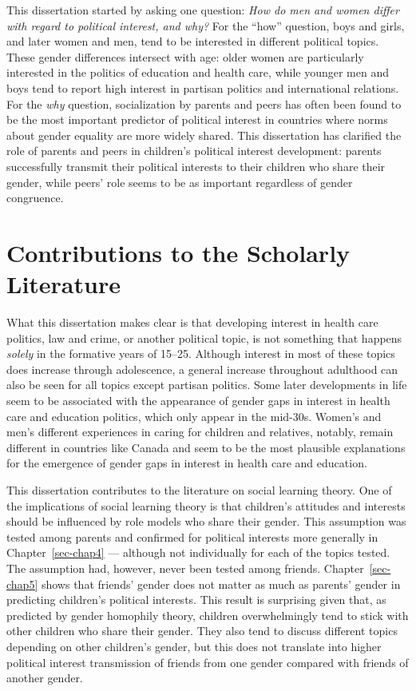 \documentclass[
  letterpaper,
  DIV=11,
  numbers=noendperiod]{scrreprt}
\begin{document}
This dissertation started by asking one question: \emph{How do men and
women differ with regard to political interest, and why?} For the
``how'' question, boys and girls, and later women and men, tend to be
interested in different political topics. These gender differences
intersect with age: older women are particularly interested in the
politics of education and health care, while younger men and boys tend
to report high interest in partisan politics and international
relations. For the \emph{why} question, socialization by parents and
peers has often been found to be the most important predictor of
political interest in countries where norms about gender equality are
more widely shared. This dissertation has clarified the role of parents
and peers in children's political interest development: parents
successfully transmit their political interests to their children who
share their gender, while peers' role seems to be as important
regardless of gender congruence.

\section{Contributions to the Scholarly
Literature}\label{contributions-to-the-scholarly-literature}

What this dissertation makes clear is that developing interest in health
care politics, law and crime, or another political topic, is not
something that happens \emph{solely} in the formative years of 15--25.
Although interest in most of these topics does increase through
adolescence, a general increase throughout adulthood can also be seen
for all topics except partisan politics. Some later developments in life
seem to be associated with the appearance of gender gaps in interest in
health care and education politics, which only appear in the mid-30s.
Women's and men's different experiences in caring for children and
relatives, notably, remain different in countries like Canada and seem
to be the most plausible explanations for the emergence of gender gaps
in interest in health care and education.

This dissertation contributes to the literature on social learning
theory. One of the implications of social learning theory is that
children's attitudes and interests should be influenced by role models
who share their gender. This assumption was tested among parents and
confirmed for political interests more generally in
Chapter~\ref{sec-chap4} --- although not individually for each of the
topics tested. The assumption had, however, never been tested among
friends. Chapter~\ref{sec-chap5} shows that friends' gender does not
matter as much as parents' gender in predicting children's political
interests. This result is surprising given that, as predicted by gender
homophily theory, children overwhelmingly tend to stick with other
children who share their gender. They also tend to discuss different
topics depending on other children's gender, but this does not translate
into higher political interest transmission of friends from one gender
compared with friends of another gender.
\end{document}
